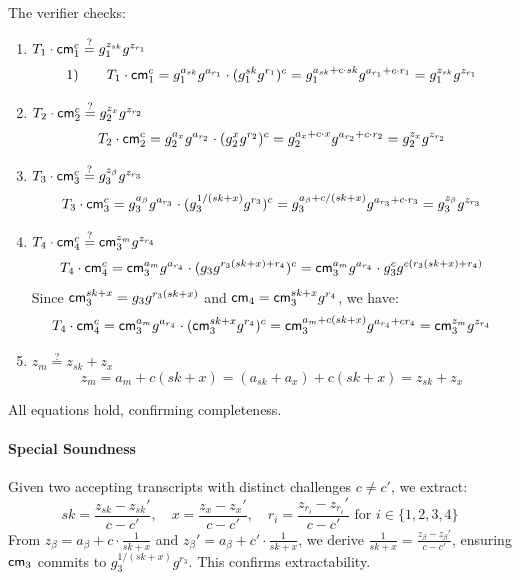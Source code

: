 The verifier checks:
\begin{enumerate}
    \item $T_1 \cdot \mathsf{cm}_1^c \stackrel{?}{=} g_1^{z_{sk}} g^{z_{r_1}}$
    \[
    1) \qquad T_1 \cdot \mathsf{cm}_1^c = g_1^{a_{sk}} g^{a_{r_1}} \cdot (g_1^{sk} g^{r_1})^c = g_1^{a_{sk} + c \cdot sk} g^{a_{r_1} + c \cdot r_1} = g_1^{z_{sk}} g^{z_{r_1}}
    \]
    \item $T_2 \cdot \mathsf{cm}_2^c \stackrel{?}{=} g_2^{z_x} g^{z_{r_2}}$
    \[
    T_2 \cdot \mathsf{cm}_2^c = g_2^{a_x} g^{a_{r_2}} \cdot (g_2^{x} g^{r_2})^c = g_2^{a_x + c \cdot x} g^{a_{r_2} + c \cdot r_2} = g_2^{z_x} g^{z_{r_2}}
    \]
    \item $T_3 \cdot \mathsf{cm}_3^c \stackrel{?}{=} g_3^{z_{\beta}} g^{z_{r_3}}$
    \[
    T_3 \cdot \mathsf{cm}_3^c = g_3^{a_{\beta}} g^{a_{r_3}} \cdot (g_3^{1/(sk + x)} g^{r_3})^c = g_3^{a_{\beta} + c / (sk + x)} g^{a_{r_3} + c \cdot r_3} = g_3^{z_{\beta}} g^{z_{r_3}}
    \]
    \item $T_4 \cdot \mathsf{cm}_4^c \stackrel{?}{=} \mathsf{cm}_3^{z_m} g^{z_{r_4}}$
    \[
    T_4 \cdot \mathsf{cm}_4^c = \mathsf{cm}_3^{a_m} g^{a_{r_4}} \cdot (g_3 g^{r_3 (sk + x) + r_4})^c = \mathsf{cm}_3^{a_m} g^{a_{r_4}} \cdot g_3^c g^{c (r_3 (sk + x) + r_4)}
    \]
    Since $\mathsf{cm}_3^{sk + x} = g_3 g^{r_3 (sk + x)}$ and $\mathsf{cm}_4 = \mathsf{cm}_3^{sk + x} g^{r_4}$, we have:
    \[
    T_4 \cdot \mathsf{cm}_4^c = \mathsf{cm}_3^{a_m} g^{a_{r_4}} \cdot (\mathsf{cm}_3^{sk + x} g^{r_4})^c = \mathsf{cm}_3^{a_m + c (sk + x)} g^{a_{r_4} + c r_4} = \mathsf{cm}_3^{z_m} g^{z_{r_4}}
    \]
    \item $z_m \stackrel{?}{=} z_{sk} + z_x$
    \[
    z_m = a_m + c (sk + x) = (a_{sk} + a_x) + c (sk + x) = z_{sk} + z_x
    \]
\end{enumerate}
All equations hold, confirming completeness.

\paragraph{Special Soundness}
Given two accepting transcripts with distinct challenges $c \neq c'$, we extract:
\[
sk = \frac{z_{sk} - z_{sk}'}{c - c'}, \quad x = \frac{z_x - z_x'}{c - c'}, \quad r_i = \frac{z_{r_i} - z_{r_i}'}{c - c'} \text{ for } i \in \{1,2,3,4\}
\]
From $z_{\beta} = a_{\beta} + c \cdot \frac{1}{sk + x}$ and $z_{\beta}' = a_{\beta} + c' \cdot \frac{1}{sk + x}$, we derive $\frac{1}{sk + x} = \frac{z_{\beta} - z_{\beta}'}{c - c'}$, ensuring $\mathsf{cm}_3$ commits to $g_3^{1/(sk + x)} g^{r_3}$. This confirms extractability.

